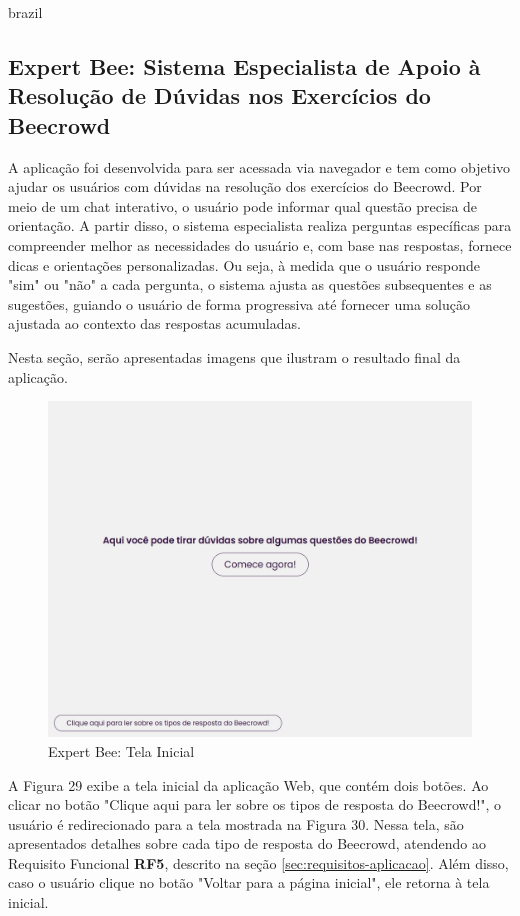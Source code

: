 \begin{otherlanguage*}{brazil}
\subsection{Expert Bee: Sistema Especialista de Apoio à Resolução de Dúvidas nos Exercícios do Beecrowd}

A aplicação foi desenvolvida para ser acessada via navegador e tem como objetivo ajudar os usuários com dúvidas na resolução dos exercícios do Beecrowd. Por meio de um chat interativo, o usuário pode informar qual questão precisa de orientação. A partir disso, o sistema especialista realiza perguntas específicas para compreender melhor as necessidades do usuário e, com base nas respostas, fornece dicas e orientações personalizadas. Ou seja, à medida que o usuário responde "sim" ou "não" a cada pergunta, o sistema ajusta as questões subsequentes e as sugestões, guiando o usuário de forma progressiva até fornecer uma solução ajustada ao contexto das respostas acumuladas.

Nesta seção, serão apresentadas imagens que ilustram o resultado final da aplicação.

\begin{figure}[H]
    \centering
            \caption{Expert Bee: Tela Inicial}
            \label{fig:ModeloConceitual}
        \includegraphics[scale=0.41]{pictures/desenvolvimento/expert_bee_tela_inicial.png}
\end{figure}

A Figura 29 exibe a tela inicial da aplicação Web, que contém dois botões. Ao clicar no botão "Clique aqui para ler sobre os tipos de resposta do Beecrowd!", o usuário é redirecionado para a tela mostrada na Figura 30. Nessa tela, são apresentados detalhes sobre cada tipo de resposta do Beecrowd, atendendo ao Requisito Funcional \textbf{RF5}, descrito na seção \ref{sec:requisitos-aplicacao}. Além disso, caso o usuário clique no botão "Voltar para a página inicial", ele retorna à tela inicial.


\end{otherlanguage*}
